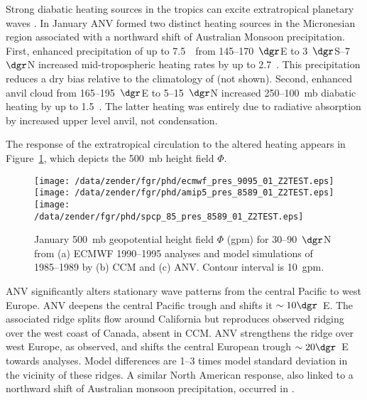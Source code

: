 \documentclass[agums]{aguplus}
\begin{document}
Strong diabatic heating sources in the tropics can excite
extratropical planetary waves \cite[e.g.,][]{HoK81}.  
In January ANV formed two distinct heating sources in the Micronesian
region associated with a northward shift of Australian Monsoon
precipitation. 
First, enhanced precipitation of up to 7.5~\mmxday\ from
145--170~$\dgr$E to 3~$\dgr$S--7~$\dgr$N increased
mid-tropospheric heating rates by up to 2.7~\kxday.
This precipitation reduces a dry bias relative to the climatology of 
\cite{LeW90} (not shown).
Second, enhanced anvil cloud from 165--195~$\dgr$E to
5--15~$\dgr$N increased 250--100~mb diabatic heating by up to
1.5~\kxday.
The latter heating was entirely due to radiative absorption by
increased upper level anvil, not condensation. 

The response of the extratropical circulation to the altered
heating appears in Figure~\ref{fig:pres_8589_Z2TEST}, which depicts
the 500~mb height field $\Phi$.  
\begin{figure*}
\begin{center}
\texttt{[image: /data/zender/fgr/phd/ecmwf\_pres\_9095\_01\_Z2TEST.eps]}%
\texttt{[image: /data/zender/fgr/phd/amip5\_pres\_8589\_01\_Z2TEST.eps]}%
\texttt{[image: /data/zender/fgr/phd/spcp\_85\_pres\_8589\_01\_Z2TEST.eps]}%
\end{center}
\caption[January 500~mb geopotential height field $\Phi$ for
30--90~$\dgr$N from ECMWF 1990--1995 analyses and model 
simulations of 1985--1989 by CCM and ANV]{
January 500~mb geopotential height field $\Phi$ (gpm) for
30--90~$\dgr$N from (a) ECMWF 1990--1995 analyses and model 
simulations of 1985--1989 by (b) CCM and (c) ANV.
Contour interval is 10~gpm. 
\label{fig:pres_8589_Z2TEST}}   
\end{figure*}
ANV significantly alters stationary wave patterns from the central
Pacific to west Europe.
ANV deepens the central Pacific trough and shifts it $\sim 10 
\dgr$~E.
The associated ridge splits flow around California but reproduces 
observed ridging over the west coast of Canada, absent in CCM.
ANV strengthens the ridge over west Europe, as observed, and shifts
the central European trough $\sim 20 \dgr$~E towards analyses. 
Model differences are 1--3 times model standard deviation in the
vicinity of these ridges. 
A similar North American response, also linked to a northward shift of
Australian monsoon precipitation, occurred in \cite{Kie942}.
\end{document}
